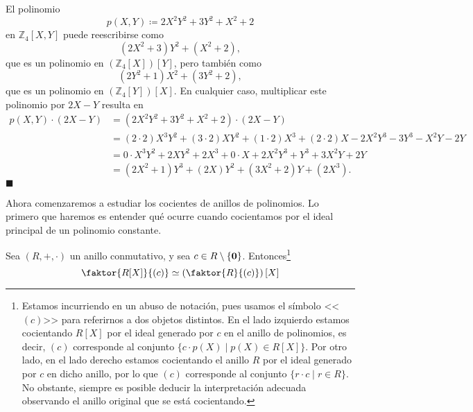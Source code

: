 \begin{example}
El polinomio $$p(X, Y) \coloneqq 2X^2Y^2 + 3Y^2 + X^2 + 2$$ en $\mathbb{Z}_4[X,Y]$ puede reescribirse como $$(2X^2 + 3)Y^2 + (X^2+2),$$ que es un polinomio en $(\mathbb{Z}_4[X])[Y]$, pero también como $$(2Y^2 + 1)X^2 + (3Y^2 + 2),$$ que es un polinomio en $(\mathbb{Z}_4[Y])[X]$. En cualquier caso, multiplicar este polinomio por $2X-Y$ resulta en
\begin{align*}
p(X, Y) \cdot (2X-Y) &=
(2X^2Y^2 + 3Y^2 + X^2 + 2) \cdot (2X-Y) \\ &= (2 \cdot 2)X^3Y^2 + (3 \cdot 2)XY^2 + (1 \cdot 2)X^3 + (2 \cdot 2)X - 2X^2Y^3 - 3Y^3 - X^2Y - 2Y \\
&= 0 \cdot X^3Y^2 + 2XY^2 + 2X^3 + 0 \cdot X + 2X^2Y^3 + Y^3 + 3X^2Y + 2Y \\
&= (2X^2 + 1)Y^3 + (2X)Y^2 + (3X^2 + 2)Y + (2X^3).
\end{align*}
\hfill$\blacksquare$
\end{example}

Ahora comenzaremos a estudiar los cocientes de anillos de polinomios. Lo primero que haremos es entender qué ocurre cuando cocientamos por el ideal principal de un polinomio constante.

\begin{proposition} \label{cociente_polinomio_constante}
Sea $(R, +, \cdot)$ un anillo conmutativo, y sea $c \in R \setminus \{ \mathbf{0} \}$. Entonces\footnote{Estamos incurriendo en un abuso de notación, pues usamos el símbolo <<$(c)$>> para referirnos a dos objetos distintos. En el lado izquierdo estamos cocientando $R[X]$ por el ideal generado por $c$ en el anillo de polinomios, es decir, $(c)$ corresponde al conjunto $\{ c  \cdot p(X) \mid p(X) \in R[X] \}$. Por otro lado, en el lado derecho estamos cocientando el anillo $R$ por el ideal generado por $c$ en dicho anillo, por lo que $(c)$ corresponde al conjunto $\{ r \cdot c \mid r \in R \}$. No obstante, siempre es posible deducir la interpretación adecuada observando el anillo original que se está cocientando.}
$$\faktor{R[X]}{(c)} \simeq \left( \faktor{R}{(c)} \right)[X]$$
\end{proposition}


